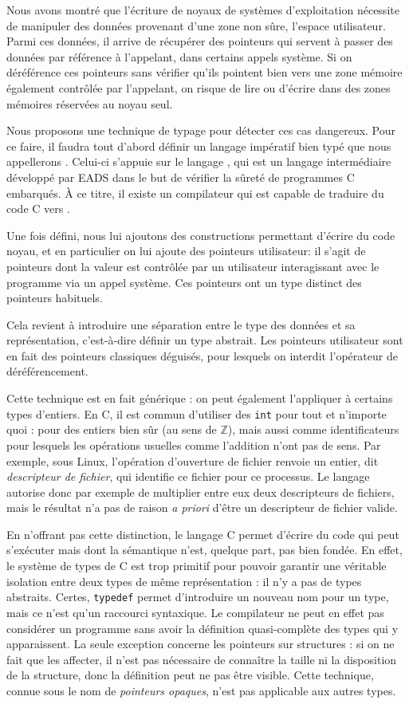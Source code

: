 
Nous avons montré que l'écriture de noyaux de systèmes d'exploitation nécessite
de manipuler des données provenant d'une zone non sûre, l'espace utilisateur.
Parmi ces données, il arrive de récupérer des pointeurs qui servent à passer des
données par référence à l'appelant, dans certains appels système. Si on
déréférence ces pointeurs sans vérifier qu'ils pointent bien vers une zone
mémoire également contrôlée par l'appelant, on risque de lire ou d'écrire dans
des zones mémoires réservées au noyau seul.

Nous proposons une technique de typage pour détecter ces cas dangereux. Pour ce
faire, il faudra tout d'abord définir un langage impératif bien typé que nous
appellerons \langname.
Celui-ci s'appuie sur le langage \newspeak, qui est un langage intermédiaire
développé par EADS dans le but de vérifier la sûreté de programmes C embarqués.
À ce titre, il existe un compilateur qui est capable de traduire du code C vers
\newspeak.

Une fois \langname défini, nous lui ajoutons des constructions permettant
d'écrire du code noyau, et en particulier on lui ajoute des pointeurs
utilisateur: il s'agit de pointeurs dont la valeur est contrôlée par un
utilisateur interagissant avec le programme via un appel système. Ces pointeurs
ont un type distinct des pointeurs habituels.

Cela revient à introduire une séparation entre le type des données et sa
représentation, c'est-à-dire définir un type abstrait. Les pointeurs
utilisateur sont en fait des pointeurs classiques déguisés, pour lesquels on
interdit l'opérateur de déréférencement.

Cette technique est en fait générique : on peut également l'appliquer à certains
types d'entiers. En C, il est commun d'utiliser des \texttt{int} pour tout et
n'importe quoi : pour des entiers bien sûr (au sens de $ℤ$), mais aussi comme
identificateurs pour lesquels les opérations usuelles comme l'addition n'ont pas
de sens. Par exemple, sous Linux, l'opération d'ouverture de fichier renvoie un
entier, dit \emph{descripteur de fichier}, qui identifie ce fichier pour ce
processus.
Le langage autorise donc par exemple de multiplier entre
eux deux descripteurs de fichiers, mais le résultat n'a pas de raison \emph{a
priori} d'être un descripteur de fichier valide.

En n'offrant pas cette distinction, le langage C permet d'écrire du code qui
peut s'exécuter mais dont la sémantique n'est, quelque part, pas bien fondée. En
effet, le système de types de C est trop primitif pour pouvoir garantir une
véritable isolation entre deux types de même représentation : il n'y a pas de
types abstraits. Certes, \texttt{typedef} permet d'introduire un nouveau nom
pour un type, mais ce n'est qu'un raccourci syntaxique. Le compilateur ne peut
en effet pas considérer un programme sans avoir la définition quasi-complète des
types qui y apparaissent. La seule exception concerne les pointeurs sur
structures : si on ne fait que les affecter, il n'est pas nécessaire de
connaître la taille ni la disposition de la structure, donc la définition peut
ne pas être visible. Cette technique, connue sous le nom de \emph{pointeurs
opaques}, n'est pas applicable aux autres types.

